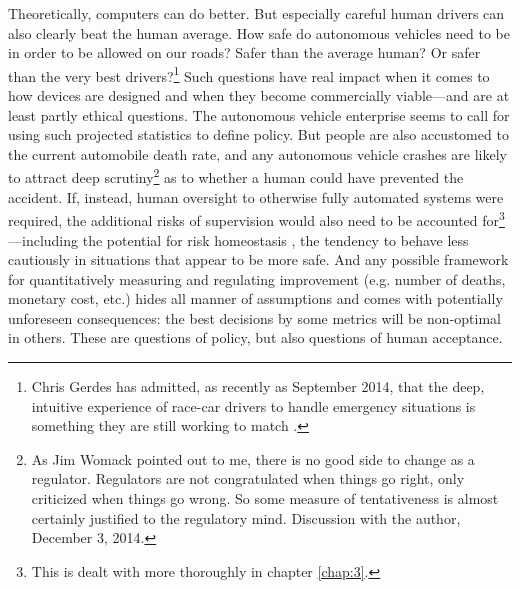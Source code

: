 Theoretically, computers can do better. But especially careful human
drivers can also clearly beat the human average. How safe do
autonomous vehicles need to be in order to be allowed on our roads?
Safer than the average human? Or safer than the very best
drivers?\footnote{Chris Gerdes has admitted, as recently as September
  2014, that the deep, intuitive experience of race-car drivers to
  handle emergency situations is something they are still working to
  match \cite{8truthsandmyths}.}
Such questions have real impact when it comes to how devices are
designed and when they become commercially viable---and are at least
partly ethical questions. The autonomous
vehicle enterprise seems to call for using such projected statistics
to define policy. But
people are also accustomed to the current automobile death rate, and
any autonomous vehicle crashes are likely to attract deep
scrutiny\footnote{As Jim Womack pointed out to me, there is no good side
to change as a regulator. Regulators are not congratulated when things
go right, only criticized when things go wrong. So some measure of
tentativeness is almost certainly justified to the regulatory mind.
Discussion with the author, December 3, 2014.} as
to whether a human could have prevented the accident. If,
instead, human oversight to otherwise fully automated systems were
required, the additional risks of supervision would also need to be
accounted for\footnote{This is dealt with more thoroughly in chapter
\ref{chap:3}.}---including the potential for risk homeostasis
\cite{Wilde}, the tendency to
behave less cautiously in situations that appear to be more safe. And
any possible framework for 
  quantitatively measuring and regulating improvement (e.g. number of deaths,
  monetary cost, etc.) hides all manner of assumptions and comes with
  potentially unforeseen consequences: the best decisions by some
  metrics will be non-optimal in others. These are questions of
  policy, but also questions of human acceptance. 

